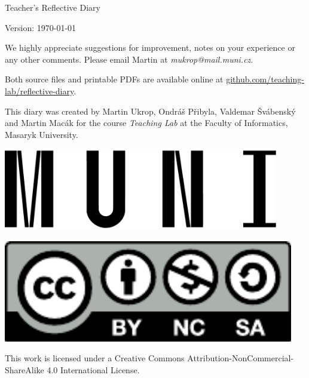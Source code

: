 \documentclass[twoside,openany]{book}
\begin{document}







\newpage
\vspace*{\fill}
Teacher's Reflective Diary

Version: \today

\bigskip
We highly appreciate suggestions for improvement, notes on your experience or any other comments. Please email Martin at \textit{mukrop@mail.muni.cz}.

Both source files and printable PDFs are available online at \url{github.com/teaching-lab/reflective-diary}.

\bigskip
\begin{minipage}{0.68\textwidth}
This diary was created by Martin Ukrop, Ondráš Přibyla, Valdemar Švábenský and Martin Macák for the course \textit{Teaching Lab} at the Faculty of Informatics, Masaryk University.
\end{minipage}
\begin{minipage}[t]{0.32\textwidth}
\hfill\includegraphics[width=0.90\textwidth]{../img/muni}
\end{minipage}

\begin{minipage}{0.32\textwidth}
\includegraphics[width=0.95\textwidth]{../img/cc-by-nc-sa}
\end{minipage}
\begin{minipage}{0.68\textwidth}
This work is licensed under a Creative Commons Attribution-NonCommercial-ShareAlike 4.0 International License.
\end{minipage}

\newpage
\thispagestyle{empty}
\mbox{}
\newpage
\thispagestyle{empty}
\mbox{}
\end{document}
